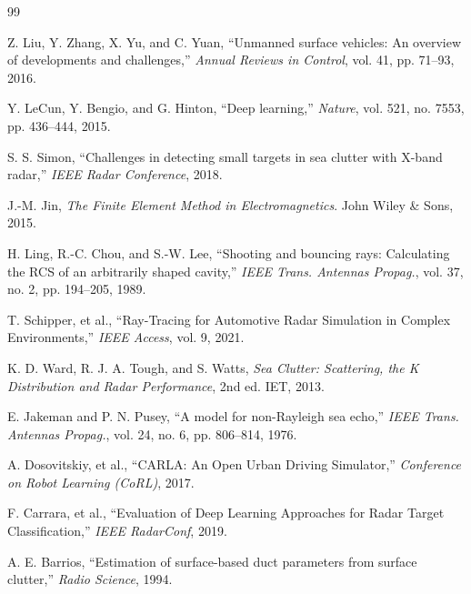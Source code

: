 \documentclass[conf]{new-aiaa}
\begin{document}
\begin{thebibliography}{99}

Z. Liu, Y. Zhang, X. Yu, and C. Yuan, ``Unmanned surface vehicles: An overview of developments and challenges,'' \emph{Annual Reviews in Control}, vol. 41, pp. 71–93, 2016.

Y. LeCun, Y. Bengio, and G. Hinton, ``Deep learning,'' \emph{Nature}, vol. 521, no. 7553, pp. 436–444, 2015.

S. S. Simon, ``Challenges in detecting small targets in sea clutter with X-band radar,'' \emph{IEEE Radar Conference}, 2018.

J.-M. Jin, \emph{The Finite Element Method in Electromagnetics}. John Wiley \& Sons, 2015.

H. Ling, R.-C. Chou, and S.-W. Lee, ``Shooting and bouncing rays: Calculating the RCS of an arbitrarily shaped cavity,'' \emph{IEEE Trans. Antennas Propag.}, vol. 37, no. 2, pp. 194–205, 1989.

T. Schipper, et al., ``Ray-Tracing for Automotive Radar Simulation in Complex Environments,'' \emph{IEEE Access}, vol. 9, 2021.

K. D. Ward, R. J. A. Tough, and S. Watts, \emph{Sea Clutter: Scattering, the K Distribution and Radar Performance}, 2nd ed. IET, 2013.

E. Jakeman and P. N. Pusey, ``A model for non-Rayleigh sea echo,'' \emph{IEEE Trans. Antennas Propag.}, vol. 24, no. 6, pp. 806–814, 1976.

A. Dosovitskiy, et al., ``CARLA: An Open Urban Driving Simulator,'' \emph{Conference on Robot Learning (CoRL)}, 2017.

F. Carrara, et al., ``Evaluation of Deep Learning Approaches for Radar Target Classification,'' \emph{IEEE RadarConf}, 2019.

A. E. Barrios, ``Estimation of surface-based duct parameters from surface clutter,'' \emph{Radio Science}, 1994.

\end{thebibliography}
\end{document}
